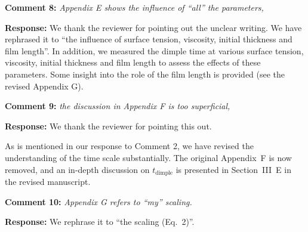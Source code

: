 \documentclass[11pt]{article}
\newif\ifhighlight
\newcommand{\hl}[1]{\ifhighlight\textcolor{blue}{#1}\else#1\fi}
\begin{document}
\bigskip
\begin{siderules}
\textbf{Comment 8:} \textit{Appendix E shows the influence of “all” the parameters,}
\end{siderules}

\textbf{Response:} We thank the reviewer for pointing out the unclear writing. We have rephrased it to ``the influence of surface tension, viscosity, initial thickness and film length''. In addition, we measured the dimple time at various surface tension, viscosity, initial thickness and film length to assess the effects of these parameters. Some insight into the role of the film length is provided (see the revised \hl{Appendix G}).

\bigskip
\begin{siderules}
\textbf{Comment 9:} \textit{the discussion in Appendix F is too superficial,}
\end{siderules}

\textbf{Response:} We thank the reviewer for pointing this out. 

As is mentioned in our response to Comment 2, we have revised the understanding of the time scale substantially. 
\hl{The original Appendix~F is now removed, and an in-depth discussion on $t_\mathrm{dimple}$ is presented in Section~III~E in the revised manuscript.}


\bigskip
\begin{siderules}
\textbf{Comment 10:} \textit{Appendix G refers to “my” scaling.}
\end{siderules}

\textbf{Response:} We rephrase it to \hl{``the scaling (Eq.~2)''}.
\end{document}
